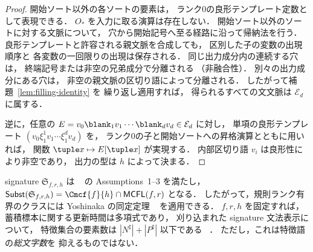 \begin{proof}
開始ソート以外の各ソートの要素は，
ランク0の良形テンプレート定数として表現できる．
$O_*$ を入力に取る演算は存在しない．
開始ソート以外のソートに対する文脈について，
穴から開始記号へ至る経路に沿って帰納法を行う．
良形テンプレートと許容される親文脈を合成しても，
区別した子の変数の出現順序と
各変数の一回限りの出現は保存される．
同じ出力成分内の連続する穴は，
終端記号または非空の兄弟成分で分離される
（非融合性）．
別々の出力成分にある穴は，
非空の親文脈の区切り語によって分離される．
したがって補題~\ref{lem:filling-identity} を
繰り返し適用すれば，
得られるすべての文文脈は $\mathcal E_d$ に属する．

逆に，任意の
$E=v_0\blank_1v_1\cdots\blank_dv_d
\in\mathcal E_d$ に対し，
単項の良形テンプレート
$(v_0\xi_1^1v_1\cdots\xi_1^dv_d)$ を，
ランク0の子と開始ソートへの昇格演算とともに用いれば，
関数 $\tuple x\mapsto E[\tuple x]$ が実現する．
内部区切り語 $v_i$ は良形性により非空であり，
出力の型は $h$ によって決まる．
\end{proof}

\begin{proposition}
\label{prop:yoshinaka2015-embedding}
signature $\mathfrak S_{f,r,h}$ は
~\cite{Yoshinaka2015General} の
Assumptions~1--3 を満たし，
\(\mathsf{Subst}(\mathfrak S_{f,r,h}) =\Cmcf{f}{h}\cap\mathsf{MCFL}(f,r)\)
となる．
したがって，規則ランク有界のクラスには
Yoshinaka の同定定理
~\cite[Theorem~1]{Yoshinaka2015General}
を適用できる．
$f,r,h$ を固定すれば，
蓄積標本に関する更新時間は多項式であり，
刈り込まれた signature 文法表示について，
特徴集合の要素数は
$|N^\sharp|+|P^\sharp|$ 以下である
~\cite[Lemma~3]{Yoshinaka2015General}．
ただし，これは特徴語の\emph{総文字数}を
抑えるものではない．
\end{proposition}

